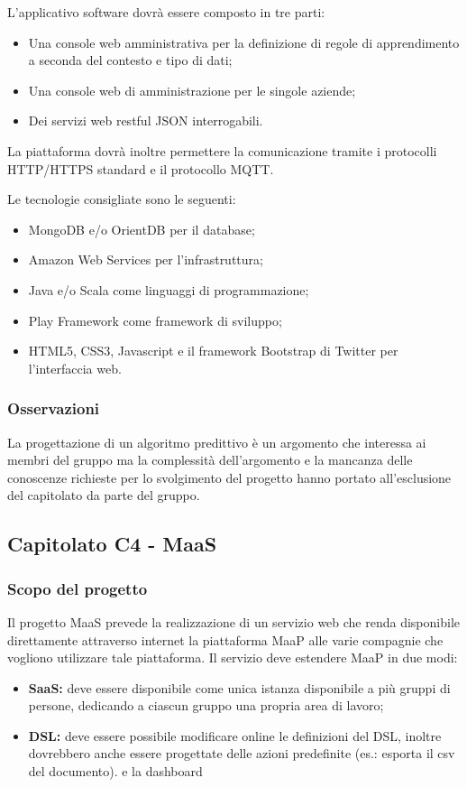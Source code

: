 L'applicativo software dovrà essere composto in tre parti:
\begin{itemize}
	\item Una console web amministrativa per la definizione di regole di apprendimento a seconda del contesto e tipo di dati;
	\item Una console web di amministrazione per le singole aziende;
	\item Dei servizi web restful JSON interrogabili.
\end{itemize}
La piattaforma dovrà inoltre permettere la comunicazione tramite i protocolli HTTP/HTTPS standard e il protocollo MQTT.


Le tecnologie consigliate sono le seguenti:
\begin{itemize}
	\item MongoDB e/o OrientDB per il database;
	\item Amazon Web Services per l'infrastruttura;
	\item Java e/o Scala come linguaggi di programmazione;
	\item Play Framework come framework di sviluppo;
	\item HTML5, CSS3, Javascript e il framework Bootstrap di Twitter per l'interfaccia web.
\end{itemize}

\subsubsection{Osservazioni}
La progettazione di un algoritmo predittivo è un argomento che interessa ai membri del gruppo ma la complessità dell'argomento e la mancanza delle conoscenze
richieste per lo svolgimento del progetto hanno portato all'esclusione del capitolato da parte del gruppo.



\subsection{Capitolato C4 - MaaS}
\subsubsection{Scopo del progetto}
Il progetto MaaS prevede la realizzazione di un servizio web che renda disponibile direttamente attraverso internet la piattaforma MaaP alle varie compagnie
che vogliono utilizzare tale piattaforma. Il servizio deve estendere MaaP in due modi:
\begin{itemize}
	\item \textbf{SaaS:} deve essere disponibile come unica istanza disponibile a più gruppi di persone, dedicando a ciascun gruppo una propria area di lavoro;
	\item \textbf{DSL:} deve essere possibile modificare online le definizioni del DSL, inoltre dovrebbero anche essere progettate delle azioni predefinite (es.: esporta il csv del documento).
	e la dashboard
\end{itemize}

